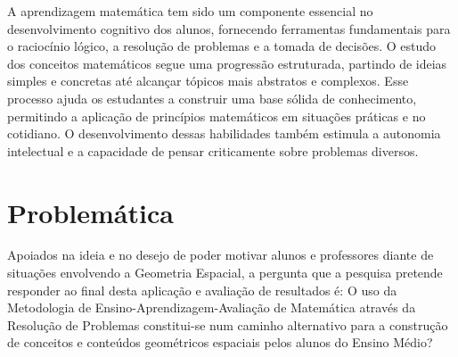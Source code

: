 
A aprendizagem matemática tem sido um componente essencial no desenvolvimento cognitivo dos alunos, fornecendo ferramentas fundamentais para o raciocínio lógico, a resolução de problemas e a tomada de decisões. O estudo dos conceitos matemáticos segue uma progressão estruturada, partindo de ideias simples e concretas até alcançar tópicos mais abstratos e complexos. Esse processo ajuda os estudantes a construir uma base sólida de conhecimento, permitindo a aplicação de princípios matemáticos em situações práticas e no cotidiano. O desenvolvimento dessas habilidades também estimula a autonomia intelectual e a capacidade de pensar criticamente sobre problemas diversos.


\section{Problemática}

Apoiados na ideia e no desejo de poder motivar alunos e professores diante de situações envolvendo a Geometria Espacial, a pergunta que a pesquisa pretende responder ao final desta aplicação e avaliação de resultados é: O uso da Metodologia de Ensino-Aprendizagem-Avaliação de Matemática através da Resolução de Problemas constitui-se num caminho alternativo para a construção de conceitos e conteúdos geométricos espaciais pelos alunos do Ensino Médio?

